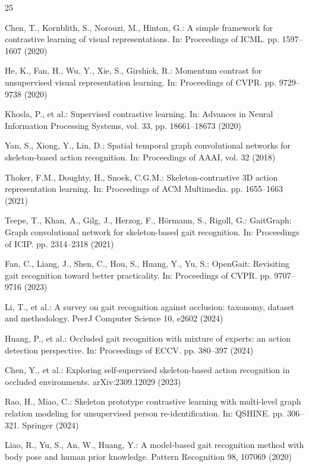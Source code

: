 \documentclass[runningheads]{llncs}
\begin{document}
\begin{thebibliography}{25}

Chen, T., Kornblith, S., Norouzi, M., Hinton, G.:
A simple framework for contrastive learning of visual representations.
In: Proceedings of ICML. pp. 1597--1607 (2020)

He, K., Fan, H., Wu, Y., Xie, S., Girshick, R.:
Momentum contrast for unsupervised visual representation learning.
In: Proceedings of CVPR. pp. 9729--9738 (2020)

Khosla, P., et al.:
Supervised contrastive learning.
In: Advances in Neural Information Processing Systems, vol. 33,
pp. 18661--18673 (2020)

Yan, S., Xiong, Y., Lin, D.:
Spatial temporal graph convolutional networks for skeleton-based action
recognition. In: Proceedings of AAAI, vol. 32 (2018)

Thoker, F.M., Doughty, H., Snoek, C.G.M.:
Skeleton-contrastive 3D action representation learning.
In: Proceedings of ACM Multimedia. pp. 1655--1663 (2021)

Teepe, T., Khan, A., Gilg, J., Herzog, F., H\"ormann, S., Rigoll, G.:
GaitGraph: Graph convolutional network for skeleton-based gait recognition.
In: Proceedings of ICIP. pp. 2314--2318 (2021)

Fan, C., Liang, J., Shen, C., Hou, S., Huang, Y., Yu, S.:
OpenGait: Revisiting gait recognition toward better practicality.
In: Proceedings of CVPR. pp. 9707--9716 (2023)

Li, T., et al.:
A survey on gait recognition against occlusion: taxonomy, dataset and
methodology. PeerJ Computer Science 10, e2602 (2024)

Huang, P., et al.:
Occluded gait recognition with mixture of experts: an action detection
perspective. In: Proceedings of ECCV. pp. 380--397 (2024)

Chen, Y., et al.:
Exploring self-supervised skeleton-based action recognition in occluded
environments. arXiv:2309.12029 (2023)

Rao, H., Miao, C.:
Skeleton prototype contrastive learning with multi-level graph relation
modeling for unsupervised person re-identification.
In: QSHINE. pp. 306--321. Springer (2024)

Liao, R., Yu, S., An, W., Huang, Y.:
A model-based gait recognition method with body pose and human prior knowledge.
Pattern Recognition 98, 107069 (2020)


\end{thebibliography}
\end{document}
